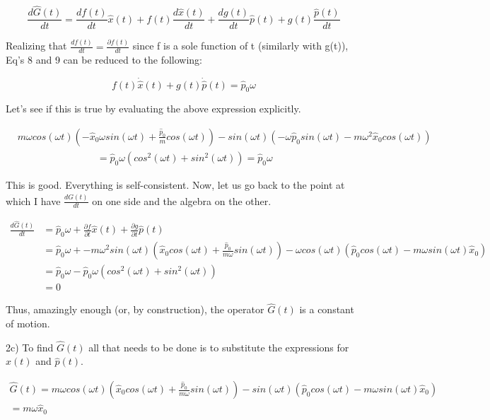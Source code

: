 \documentclass[aps,prl,preprint,groupedaddress]{revtex4-1}
\begin{document}
\begin{equation}\frac{d\hat{G}(t)}{dt}=\frac{df(t)}{dt}\hat{x}(t)+f(t)\frac{d\hat{x}(t)}{dt}+\frac{dg(t)}{dt}\hat{p}(t)+g(t)\frac{\hat{p}(t)}{dt}\end{equation}	

Realizing that $\frac{df(t)}{dt}=\frac{\partial f(t)}{dt}$ since f is a sole function of t (similarly with g(t)), Eq's 8 and 9 can be reduced to the following:

\[f(t)\dot{\hat{x}}(t)+g(t)\dot{\hat{p}}(t)=\hat{p}_0 \omega\]

Let's see if this is true by evaluating the above expression explicitly.

\begin{align*}
&m\omega cos(\omega t)(-\hat{x}_0\omega sin(\omega t) + \frac{\hat{p}_0}{m}cos(\omega t))-sin(\omega t)(-\omega \hat{p}_0 sin(\omega t) - m\omega^2\hat{x}_0 cos(\omega t))\\
&\hspace{8em}=\hat{p}_0 \omega (cos^2(\omega t)+sin^2(\omega t)) = \hat{p}_0 \omega
\end{align*}

This is good. Everything is self-consistent. Now, let us go back to the point at which I have $\frac{d\hat{G}(t)}{dt}$ on one side and the algebra on the other.

\begin{align*}
\frac{d\hat{G}(t)}{dt}&=\hat{p}_0\omega + \frac{\partial f}{\partial t}\hat{x}(t) + \frac{\partial g}{\partial t}\hat{p}(t)\\
&=\hat{p}_0\omega + -m\omega^2sin(\omega t)(\hat{x}_0cos(\omega t)+\frac{\hat{p}_0}{m\omega}sin(\omega t)) - \omega cos(\omega t)(\hat{p}_0 cos(\omega t) - m \omega sin(\omega t) \hat{x}_0)\\
&=\hat{p}_0\omega - \hat{p}_0\omega (cos^2(\omega t)+sin^2(\omega t))\\
&= 0
\end{align*}

Thus, amazingly enough (or, by construction), the operator $\hat{G}(t)$ is a constant of motion.

2c) To find $\hat{G}(t)$ all that needs to be done is to substitute the expressions for $\hat{x}(t)$ and $\hat{p}(t)$.

\begin{align*}
\hat{G}(t)=m\omega cos(\omega t)(\hat{x}_0cos(\omega t)+\frac{\hat{p}_0}{m\omega}sin(\omega t))-sin(\omega t)(\hat{p}_0 cos(\omega t) - m \omega sin(\omega t) \hat{x}_0)\\
=m\omega \hat{x}_0
\end{align*}
\end{document}
